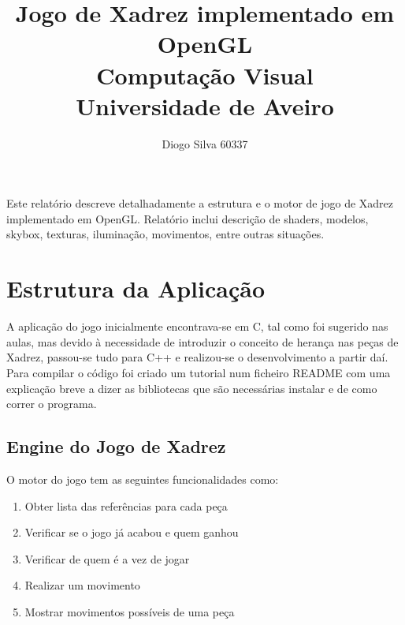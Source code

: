 \documentclass[portugues,final]{revdetua}
\begin{document}

\title{\textbf{Jogo de Xadrez implementado em OpenGL} \\ Computação Visual\\Universidade de Aveiro}
\author{Diogo Silva 60337}
\maketitle
\begin{resumo} %
Este relatório descreve detalhadamente a estrutura e o motor de jogo de Xadrez implementado em OpenGL.
Relatório inclui descrição de shaders, modelos, skybox, texturas, iluminação, movimentos, entre outras situações.
\end{resumo}


\section{Estrutura da Aplicação}

A aplicação do jogo inicialmente encontrava-se em C, tal como foi sugerido nas aulas, mas devido à necessidade de introduzir o conceito de herança nas peças de Xadrez, passou-se tudo para C++ e realizou-se o desenvolvimento a partir daí.\\

Para compilar o código foi criado um tutorial num ficheiro README com uma explicação breve a dizer as bibliotecas que são necessárias instalar e de como correr o programa.

\subsection{Engine do Jogo de Xadrez}

O motor do jogo tem as seguintes funcionalidades como:
\begin{enumerate}
\item{Obter lista das referências para cada peça}
\item{Verificar se o jogo já acabou e quem ganhou}
\item{Verificar de quem é a vez de jogar}
\item{Realizar um movimento}
\item{Mostrar movimentos possíveis de uma peça}
\end{enumerate}
\end{document}
